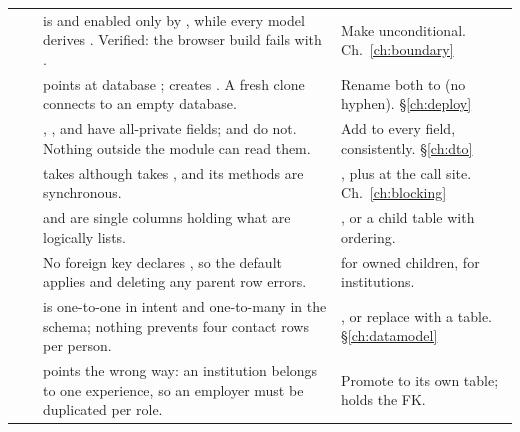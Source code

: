 \begin{longtable}{@{}p{}p{}L{0.375\textwidth}L{0.40\textwidth}@{}}
 &  &  is  and enabled only by
, while every model derives . Verified: the browser build fails with
. & Make  unconditional.
Ch.~\ref{ch:boundary} \\

 &  &  points at database ;
 creates . A fresh clone connects to an empty database. &
Rename both to  (no hyphen). \S\ref{ch:deploy} \\

 &  & , ,
 and  have all-private fields;
 and  do not. Nothing outside the module can read them. &
Add  to every field, consistently. \S\ref{ch:dto} \\

 &  &  takes  although
 takes , and its methods are synchronous. & , plus
 at the call site. Ch.~\ref{ch:blocking} \\

 &  &  and  are
 single columns holding what are logically lists. & , or a
 child table with ordering. \\

 &  & No foreign key declares , so the default
 applies and deleting any parent row errors. &  for owned
children,  for institutions. \\

 &  &  is one-to-one in intent and one-to-many
in the schema; nothing prevents four contact rows per person. & , or
replace with a  table. \S\ref{ch:datamodel} \\

 &  &  points the wrong way: an institution belongs
to one experience, so an employer must be duplicated per role. & Promote  to its
own table;  holds the FK. \\


\end{longtable}
